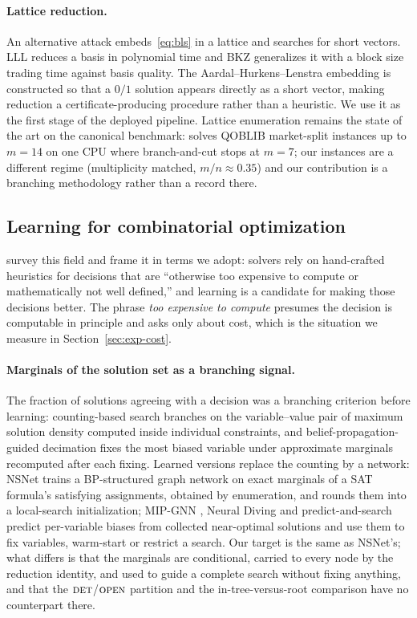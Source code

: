 \documentclass[preprint,12pt]{elsarticle}
\newcommand{\FORCED}{\textsc{det}}
\newcommand{\FREE}{\textsc{open}}
\begin{document}
\paragraph{Lattice reduction.} An alternative attack embeds~\eqref{eq:bls} in a lattice and searches for short vectors. LLL \citep{lenstra1982factoring} reduces a basis in polynomial time and BKZ \citep{schnorr1994lattice} generalizes it with a block size trading time against basis quality. The Aardal--Hurkens--Lenstra embedding \citep{aardal2000diophantine, aardal2000market} is constructed so that a $0/1$ solution appears directly as a short vector, making reduction a certificate-producing procedure rather than a heuristic. We use it as the first stage of the deployed pipeline. Lattice enumeration remains the state of the art on the canonical benchmark: \citet{wassermann2025solving} solves QOBLIB market-split instances up to $m=14$ on one CPU where branch-and-cut stops at $m=7$; our instances are a different regime (multiplicity matched, $m/n\approx0.35$) and our contribution is a branching methodology rather than a record there.

\subsection{Learning for combinatorial optimization}

\citet{bengio2021machine} survey this field and frame it in terms we adopt: solvers rely on hand-crafted heuristics for decisions that are ``otherwise too expensive to compute or mathematically not well defined,'' and learning is a candidate for making those decisions better. The phrase \emph{too expensive to compute} presumes the decision is computable in principle and asks only about cost, which is the situation we measure in Section~\ref{sec:exp-cost}.

\paragraph{Marginals of the solution set as a branching signal.} The fraction of solutions agreeing with a decision was a branching criterion before learning: counting-based search \citep{pesant2012counting} branches on the variable--value pair of maximum solution density computed inside individual constraints, and belief-propagation-guided decimation \citep{montanari2007solving} fixes the most biased variable under approximate marginals recomputed after each fixing. Learned versions replace the counting by a network: NSNet \citep{li2022nsnet} trains a BP-structured graph network on exact marginals of a SAT formula's satisfying assignments, obtained by enumeration, and rounds them into a local-search initialization; MIP-GNN \citep{khalil2022mipgnn}, Neural Diving \citep{nair2020solving} and predict-and-search \citep{han2023gnn} predict per-variable biases from collected near-optimal solutions and use them to fix variables, warm-start or restrict a search. Our target is the same as NSNet's; what differs is that the marginals are conditional, carried to every node by the reduction identity, and used to guide a complete search without fixing anything, and that the $\FORCED$/$\FREE$ partition and the in-tree-versus-root comparison have no counterpart there.
\end{document}
